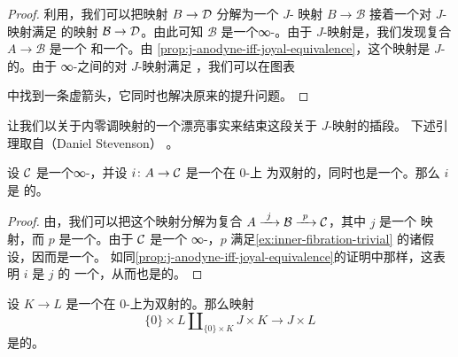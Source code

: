 \begin{proof}
利用\trSmallObjectArgument{}，我们可以把映射 $B \to \mathcal{D}$ 分解为一个 $J$-\trAnodyne{}%
映射 $B \to \mathcal{B}$ 接着一个对 $J$-\trAnodyne{}映射满足\trRightLiftingProperty{}%
的映射 $\mathcal{B} \to \mathcal{D}$。由此可知 $\mathcal{B}$ 是一个∞-\trCategory{}。由于
$J$-\trAnodyne{}映射是\trJoyalEquivalence{}，我们发现复合 $A \to \mathcal{B}$ 是一个%
\trMonomorphism{}和一个\trJoyalEquivalence{}。由%
\cref{prop:j-anodyne-iff-joyal-equivalence}，这个映射是 $J$-\trAnodyne{}的。由于
∞-\trCategories{}之间的\trIsofibration{}对 $J$-\trAnodyne{}映射满足%
\trRightLiftingProperty{}，我们可以在图表
\begin{center}
\end{center}
中找到一条虚箭头，它同时也解决原来的提升问题。
\end{proof}

让我们以关于内零调映射的一个漂亮事实来结束这段关于 $J$-\trAnodyne{}映射的插段。
下述引理取自\trStevenson{}（Daniel Stevenson） \cite[Lemma 2.19]{Ste18a}。

\begin{lemma}\label{lem:mono-bijection-inner-anodyne}
设 $\mathcal{C}$ 是一个∞-\trCategory{}，并设 $i\colon A \to \mathcal{C}$ 是一个在 $0$-\trSimplex{}上
为双射的\trMonomorphism{}，同时也是一个\trJoyalEquivalence{}。那么 $i$ 是%
\trInnerAnodyne{}的。
\end{lemma}

\begin{proof}
由\trSmallObjectArgument{}，我们可以把这个映射分解为复合
$A \xrightarrow{\ j\ } \mathcal{B} \xrightarrow{\ p\ } \C$，其中 $j$ 是一个%
\trInnerAnodyne{}映射，而 $p$ 是一个\trInnerFibration{}。由于 $\mathcal{C}$ 是一个%
∞-\trCategory{}，$p$ 满足\cref{ex:inner-fibration-trivial} 的诸假设，因而是一个\trTrivialFibration{}。
如同\cref{prop:j-anodyne-iff-joyal-equivalence}的证明中那样，这表明 $i$ 是 $j$ 的
一个\trRetract{}，从而也是\trInnerAnodyne{}的。
\end{proof}

\begin{corollary}\label{cor:pushout-product-j-inner-anodyne}
设 $K \to L$ 是一个在 $0$-\trSimplex{}上为双射的\trMonomorphism{}。那么映射
\[
\{0\} \times L \amalg_{\{0\} \times K} J \times K \longrightarrow J \times L
\]
是\trInnerAnodyne{}的。
\end{corollary}

